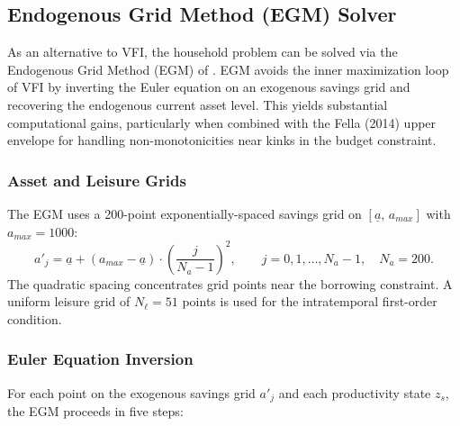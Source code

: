 \documentclass[12pt]{article}
\begin{document}
\subsection{Endogenous Grid Method (EGM) Solver}\label{sec:egm}

As an alternative to VFI, the household problem can be solved via the Endogenous Grid Method (EGM) of \citet{carroll2006}. EGM avoids the inner maximization loop of VFI by inverting the Euler equation on an exogenous savings grid and recovering the endogenous current asset level. This yields substantial computational gains, particularly when combined with the Fella (2014) upper envelope for handling non-monotonicities near kinks in the budget constraint.

\subsubsection{Asset and Leisure Grids}

The EGM uses a 200-point exponentially-spaced savings grid on $[\underline{a},\, a_{max}]$ with $a_{max} = 1000$:
\begin{equation}\label{eq:egm_grid}
  a'_j = \underline{a} + (a_{max} - \underline{a}) \cdot \left(\frac{j}{N_a - 1}\right)^2, \qquad j = 0, 1, \ldots, N_a - 1, \quad N_a = 200.
\end{equation}
The quadratic spacing concentrates grid points near the borrowing constraint. A uniform leisure grid of $N_\ell = 51$ points is used for the intratemporal first-order condition.

\subsubsection{Euler Equation Inversion}

For each point on the exogenous savings grid $a'_j$ and each productivity state $z_s$, the EGM proceeds in five steps:
\end{document}
